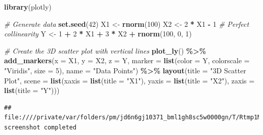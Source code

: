 \documentclass[
]{book}
\newenvironment{Shaded}{\begin{snugshade}}{\end{snugshade}}
\newcommand{\AttributeTok}[1]{\textcolor[rgb]{0.13,0.29,0.53}{#1}}
\newcommand{\CommentTok}[1]{\textcolor[rgb]{0.56,0.35,0.01}{\textit{#1}}}
\newcommand{\DecValTok}[1]{\textcolor[rgb]{0.00,0.00,0.81}{#1}}
\newcommand{\FunctionTok}[1]{\textcolor[rgb]{0.13,0.29,0.53}{\textbf{#1}}}
\newcommand{\NormalTok}[1]{#1}
\newcommand{\OtherTok}[1]{\textcolor[rgb]{0.56,0.35,0.01}{#1}}
\newcommand{\SpecialCharTok}[1]{\textcolor[rgb]{0.81,0.36,0.00}{\textbf{#1}}}
\newcommand{\StringTok}[1]{\textcolor[rgb]{0.31,0.60,0.02}{#1}}
\begin{document}
\begin{Shaded}
\begin{Highlighting}[]
\FunctionTok{library}\NormalTok{(plotly)}

\CommentTok{\# Generate data}
\FunctionTok{set.seed}\NormalTok{(}\DecValTok{42}\NormalTok{)}
\NormalTok{X1 }\OtherTok{\textless{}{-}} \FunctionTok{rnorm}\NormalTok{(}\DecValTok{100}\NormalTok{)}
\NormalTok{X2 }\OtherTok{\textless{}{-}} \DecValTok{2} \SpecialCharTok{*}\NormalTok{ X1 }\SpecialCharTok{{-}} \DecValTok{1}  \CommentTok{\# Perfect collinearity}
\NormalTok{Y  }\OtherTok{\textless{}{-}} \DecValTok{1} \SpecialCharTok{+} \DecValTok{2} \SpecialCharTok{*}\NormalTok{ X1 }\SpecialCharTok{+} \DecValTok{3} \SpecialCharTok{*}\NormalTok{ X2 }\SpecialCharTok{+} \FunctionTok{rnorm}\NormalTok{(}\DecValTok{100}\NormalTok{, }\DecValTok{0}\NormalTok{, }\DecValTok{1}\NormalTok{)}

\CommentTok{\# Create the 3D scatter plot with vertical lines}
\FunctionTok{plot\_ly}\NormalTok{() }\SpecialCharTok{\%\textgreater{}\%}
  \FunctionTok{add\_markers}\NormalTok{(}\AttributeTok{x =}\NormalTok{ X1, }\AttributeTok{y =}\NormalTok{ X2, }\AttributeTok{z =}\NormalTok{ Y, }
              \AttributeTok{marker =} \FunctionTok{list}\NormalTok{(}\AttributeTok{color =}\NormalTok{ Y, }\AttributeTok{colorscale =} \StringTok{"Viridis"}\NormalTok{, }\AttributeTok{size =} \DecValTok{5}\NormalTok{),}
              \AttributeTok{name =} \StringTok{"Data Points"}\NormalTok{) }\SpecialCharTok{\%\textgreater{}\%}
  \FunctionTok{layout}\NormalTok{(}\AttributeTok{title =} \StringTok{"3D Scatter Plot"}\NormalTok{,}
         \AttributeTok{scene =} \FunctionTok{list}\NormalTok{(}\AttributeTok{xaxis =} \FunctionTok{list}\NormalTok{(}\AttributeTok{title =} \StringTok{"X1"}\NormalTok{),}
                      \AttributeTok{yaxis =} \FunctionTok{list}\NormalTok{(}\AttributeTok{title =} \StringTok{"X2"}\NormalTok{),}
                      \AttributeTok{zaxis =} \FunctionTok{list}\NormalTok{(}\AttributeTok{title =} \StringTok{"Y"}\NormalTok{)))}
\end{Highlighting}
\end{Shaded}

\begin{verbatim}
## file:////private/var/folders/pm/jd6n6gj10371_bml1gh8sc5w0000gn/T/Rtmp1MEKvh/file15e3f6e321546/widget15e3f1a12df2f.html screenshot completed
\end{verbatim}
\end{document}
